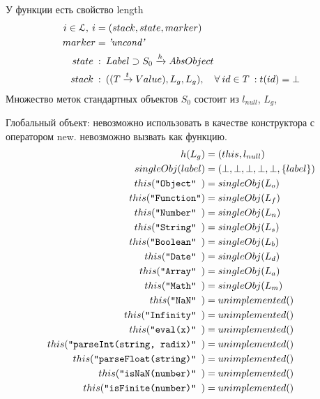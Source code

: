 У функции есть свойство length
\[
\begin{aligned}
   i \in \EuScript{L},\: i & = (stack, state, marker) \\
   marker & = {\emph{'uncond'}}\\
   state \:&:\: Label \supset S_0 \xrightarrow{h} AbsObject \\
   stack \:&:\: ((T \xrightarrow{t} Value), L_g, L_g), \quad \forall\: id \in T\::
     t(id) = \bot \\
\end{aligned}
\]
Множество меток стандартных объектов $S_0$ состоит из $l_{null}$,
$L_g$,

Глобальный объект:
  невозможно использовать в качестве конструктора с оператором new.
  невозможно вызвать как функцию.
\[
\begin{aligned}
h(L_g) &= (this, l_{null})    \\
singleObj(label) &= (\bot, \bot, \bot,  \bot,  \bot, \{ label \} ) \\
this( \mbox{\texttt{``Object''  }}) &=  singleObj( L_{o}  )  \\
this( \mbox{\texttt{``Function''}}) &=  singleObj( L_{f}  )  \\
this( \mbox{\texttt{``Number''  }}) &=  singleObj( L_{n}  )  \\
this( \mbox{\texttt{``String''  }}) &=  singleObj( L_{s}  )  \\
this( \mbox{\texttt{``Boolean'' }}) &=  singleObj( L_{b}  )  \\
this( \mbox{\texttt{``Date''    }}) &=  singleObj( L_{d}  )  \\
this( \mbox{\texttt{``Array''   }}) &=  singleObj( L_{a}  )  \\
this( \mbox{\texttt{``Math''   }})  &=  singleObj( L_{m}  )  \\
  this( \mbox{\texttt{``NaN'' }})   &= unimplemented()  \\
  this( \mbox{\texttt{``Infinity'' }})   &= unimplemented()  \\
  this( \mbox{\texttt{``eval(x)'' }})   &= unimplemented()  \\
  this( \mbox{\texttt{``parseInt(string, radix)'' }})   &= unimplemented()  \\
  this( \mbox{\texttt{``parseFloat(string)'' }})   &= unimplemented()  \\
  this( \mbox{\texttt{``isNaN(number)'' }})   &= unimplemented()  \\
  this( \mbox{\texttt{``isFinite(number)'' }})   &= unimplemented()  \\
\end{aligned}
\]

